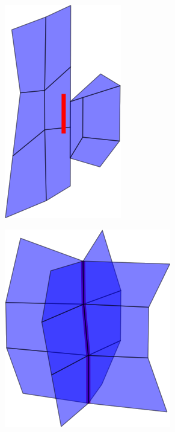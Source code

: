 \begin{figure}
\begin{center}
\begin{subfigure}[b]{.45\textwidth}
\end{subfigure}
\begin{subfigure}[b]{.45\textwidth}
\centering
\includegraphics[height = .17\textheight, width = .5\textwidth,keepaspectratio]{Pictures/SurfaceReconstruction/3DManifoldIIRes}
\end{subfigure}
\begin{subfigure}[b]{.45\textwidth}
\centering
\includegraphics[height = .17\textheight, width = .5\textwidth,keepaspectratio]{Pictures/SurfaceReconstruction/3DManifoldMM}
\end{subfigure}
\begin{subfigure}[b]{.45\textwidth}
\centering

\end{subfigure}
\end{center}
\end{figure}
